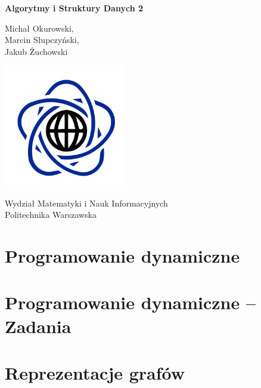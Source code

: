 




\begin{titlepage}
    \begin{center}
        \vspace*{1cm}

        \Huge

        \textbf{Algorytmy i Struktury Danych 2}

        \vspace{1.5cm}

        \LARGE

        Michał Okurowski, \\
		Marcin Słupczyński, \\
		Jakub Żuchowski
        \vfill  

        \vspace{0.8cm}

        \includegraphics[width=0.4\textwidth]{data/university.png}

        Wydział Matematyki i Nauk Informacyjnych\\
        Politechnika Warszawska\\
    \end{center}
\end{titlepage}

\tableofcontents
\pagebreak

\section{Programowanie dynamiczne}

\section{Programowanie dynamiczne -- Zadania}

\section{Reprezentacje grafów}

